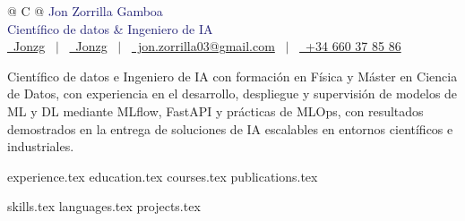 \documentclass[letterpaper, 11pt]{article}
\begin{document}

\begin{tabularx}{\linewidth}{@{} C @{}}
\Huge{\textcolor{MidnightBlue}{Jon Zorrilla Gamboa}} \\[7.5pt]
\textcolor{MidnightBlue}{Científico de datos \& Ingeniero de IA} \\[7.5pt]

\href{https://linkedin.com/in/jonzg}{\raisebox{-0.05\height}\faLinkedin\ Jonzg} \ $|$ \ 
\href{https://github.com/jonzg}{\raisebox{-0.05\height}\faGithub\ Jonzg} \ $|$ \ 
\href{mailto:jon.zorrilla03@gmail.com}{\raisebox{-0.05\height}\faEnvelope \ jon.zorrilla03@gmail.com} \ $|$ \
\href{callto:+34 660 37 85 86}{\raisebox{-0.05\height}\faPhone \ +34 660 37 85 86} \  \ 
\end{tabularx}


\justify
Científico de datos e Ingeniero de IA con formación en Física y Máster en Ciencia de Datos, con experiencia en el desarrollo, despliegue y supervisión de modelos de ML y DL mediante MLflow, FastAPI y prácticas de MLOps, con resultados demostrados en la entrega de soluciones de IA escalables en entornos científicos e industriales.

{experience.tex}
{education.tex}
{courses.tex}
{publications.tex}


\sidebyside
    {{skills.tex}}
    {{languages.tex}}
{projects.tex}
\end{document}
